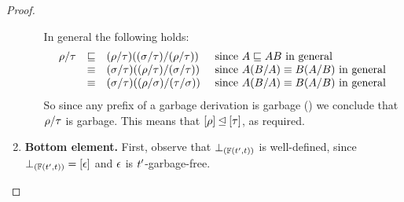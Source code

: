 \begin{proof}
\begin{enumerate}
\begin{enumerate}
    In general the following holds:
    \[
      \begin{array}{rcll}
      \rho/\tau
      & \sqsubseteq & (\rho/\tau)((\sigma/\tau)/(\rho/\tau))    & \text{ since $A \sqsubseteq AB$ in general} \\
      & \equiv & (\sigma/\tau)((\rho/\tau)/(\sigma/\tau)) & \text{ since $A(B/A) \equiv B(A/B)$ in general} \\
      & \equiv & (\sigma/\tau)((\rho/\sigma)/(\tau/\sigma))   & \text{ since $A(B/A) \equiv B(A/B)$ in general} \\
      \end{array}
    \]
    So since any prefix of a garbage derivation is garbage ()
    we conclude that $\rho/\tau$ is garbage.
    This means that $[\rho] \unlhd [\tau]$, as required.
  \end{enumerate}
\item {\bf Bottom element.}
  First, observe that $\bot_{(\mathbb{F}(t', t))}$ is well-defined,
  since $\bot_{(\mathbb{F}(t', t))} = [\epsilon]$
  and $\epsilon$ is $t'$-garbage-free.


\end{enumerate}
\end{proof}

